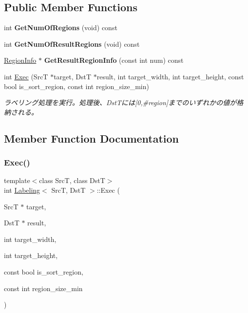 \subsection*{Public Member Functions}
\begin{DoxyCompactItemize}
\item 
\hypertarget{class_labeling_a7ef9dffc4fdda47cab7bd87d16419bcc}{}\label{class_labeling_a7ef9dffc4fdda47cab7bd87d16419bcc} 
int {\bfseries Get\+Num\+Of\+Regions} (void) const
\item 
\hypertarget{class_labeling_ac459520ccd9b51c42c9e19aa08dd49d2}{}\label{class_labeling_ac459520ccd9b51c42c9e19aa08dd49d2} 
int {\bfseries Get\+Num\+Of\+Result\+Regions} (void) const
\item 
\hypertarget{class_labeling_a61c657da16920ffd8570c9ffa6fe7c1a}{}\label{class_labeling_a61c657da16920ffd8570c9ffa6fe7c1a} 
\hyperlink{class_labeling_1_1_region_info}{Region\+Info} $\ast$ {\bfseries Get\+Result\+Region\+Info} (const int num) const
\item 
int \hyperlink{class_labeling_a639673f1a391609c6a78f46b0575774a}{Exec} (SrcT $\ast$target, DstT $\ast$result, int target\+\_\+width, int target\+\_\+height, const bool is\+\_\+sort\+\_\+region, const int region\+\_\+size\+\_\+min)
\begin{DoxyCompactList}\small\item\em ラベリング処理を実行。処理後、\+Dst\+Tには\mbox{[}0,\#region\mbox{]}までのいずれかの値が格納される。 \end{DoxyCompactList}\end{DoxyCompactItemize}


\subsection{Member Function Documentation}
\hypertarget{class_labeling_a639673f1a391609c6a78f46b0575774a}{}\label{class_labeling_a639673f1a391609c6a78f46b0575774a} 
\subsubsection{\texorpdfstring{Exec()}{Exec()}}
{\footnotesize\ttfamily template$<$class SrcT, class DstT$>$ \\
int \hyperlink{class_labeling}{Labeling}$<$ SrcT, DstT $>$\+::Exec (\begin{DoxyParamCaption}\item[{SrcT $\ast$}]{target,  }\item[{DstT $\ast$}]{result,  }\item[{int}]{target\+\_\+width,  }\item[{int}]{target\+\_\+height,  }\item[{const bool}]{is\+\_\+sort\+\_\+region,  }\item[{const int}]{region\+\_\+size\+\_\+min }\end{DoxyParamCaption})\hspace{0.3cm}{\ttfamily [inline]}}



